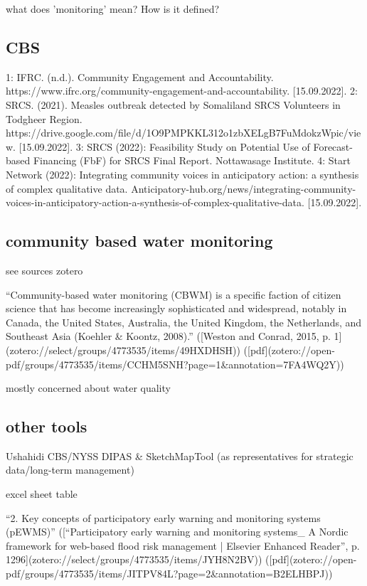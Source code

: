 {what does 'monitoring' mean? How is it defined?

\subsection{CBS}
1: IFRC. (n.d.). Community Engagement and Accountability. https://www.ifrc.org/community-engagement-and-accountability. [15.09.2022].
2: SRCS. (2021). Measles outbreak detected by Somaliland SRCS Volunteers in Todgheer Region. https://drive.google.com/file/d/1O9PMPKKL312o1zbXELgB7FuMdokzWpic/view. [15.09.2022].
3: SRCS (2022): Feasibility Study on Potential Use of Forecast-based Financing (FbF) for SRCS Final Report. Nottawasage Institute.
4: Start Network (2022): Integrating community voices in anticipatory action: a synthesis of complex qualitative data. Anticipatory-hub.org/news/integrating-community-voices-in-anticipatory-action-a-synthesis-of-complex-qualitative-data. [15.09.2022].


\subsection{community based water monitoring}
see sources zotero

“Community-based water monitoring (CBWM) is a specific faction of citizen science that has become increasingly sophisticated and widespread, notably in Canada, the United States, Australia, the United Kingdom, the Netherlands, and Southeast Asia (Koehler & Koontz, 2008).” ([Weston and Conrad, 2015, p. 1](zotero://select/groups/4773535/items/49HXDHSH)) ([pdf](zotero://open-pdf/groups/4773535/items/CCHM5SNH?page=1&annotation=7FA4WQ2Y))

mostly concerned about water quality

\subsection{other tools}

Ushahidi
CBS/NYSS
DIPAS \& SketchMapTool (as representatives for strategic data/long-term management)

excel sheet table

“2. Key concepts of participatory early warning and monitoring systems (pEWMS)” ([“Participatory early warning and monitoring systems_ A Nordic framework for web-based flood risk management | Elsevier Enhanced Reader”, p. 1296](zotero://select/groups/4773535/items/JYH8N2BV)) ([pdf](zotero://open-pdf/groups/4773535/items/JITPV84L?page=2&annotation=B2ELHBPJ))

}
